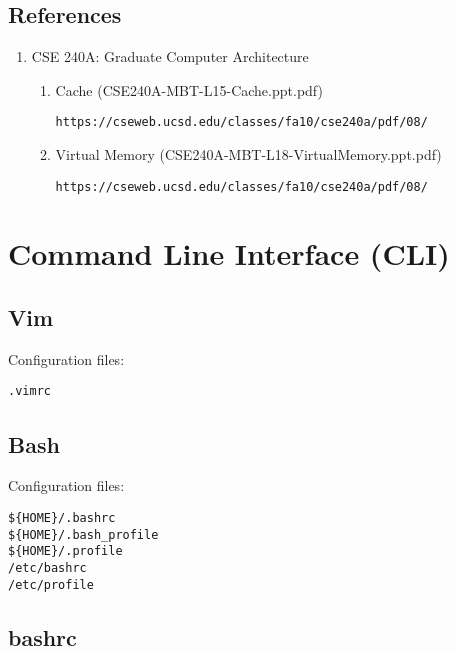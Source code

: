 \documentclass{article}
\begin{document}
\subsection{References}

\begin{enumerate}

\item CSE 240A: Graduate Computer Architecture

	\begin{enumerate}

	\item Cache (CSE240A-MBT-L15-Cache.ppt.pdf)

	\texttt{https://cseweb.ucsd.edu/classes/fa10/cse240a/pdf/08/}

	\item Virtual Memory (CSE240A-MBT-L18-VirtualMemory.ppt.pdf)

	\texttt{https://cseweb.ucsd.edu/classes/fa10/cse240a/pdf/08/}

	\end{enumerate}

\end{enumerate}

\section{Command Line Interface (CLI)}

\subsection{Vim}

Configuration files:

\begin{verbatim}
.vimrc
\end{verbatim}

\subsection{Bash}

Configuration files:

\begin{verbatim}
${HOME}/.bashrc
${HOME}/.bash_profile
${HOME}/.profile
/etc/bashrc
/etc/profile
\end{verbatim}

\subsection{bashrc}
\end{document}
